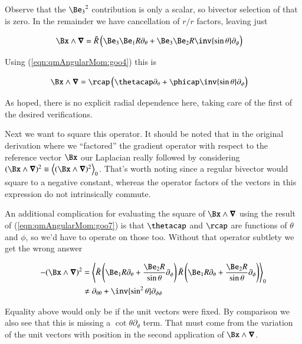 Observe that the ${\Be_3}^2$ contribution is only a scalar, so bivector selection of that is zero.  In the remainder we have cancellation of $r/r$ factors, leaving just

\begin{align}\label{eqn:qmAngularMom:goo6}
\Bx \wedge \spacegrad 
&=
\tilde{R} \left( \Be_3 \Be_1 R \partial_\theta + \Be_3 \Be_2 R \inv{\sin\theta} \partial_\phi \right) 
\end{align}

Using (\ref{eqn:qmAngularMom:goo4}) this is

\begin{align}\label{eqn:qmAngularMom:goo7}
\Bx \wedge \spacegrad 
&=
\rcap \left( \thetacap \partial_\theta + \phicap \inv{\sin\theta} \partial_\phi \right) 
\end{align}

As hoped, there is no explicit radial dependence here, taking care of the first of the desired verifications.

Next we want to square this operator.  It should be noted that in the original derivation where we ``factored'' the gradient operator with respect to the reference vector $\Bx$ our Laplacian really followed by considering $(\Bx \wedge \spacegrad)^2 \equiv \gpgradezero{(\Bx \wedge \spacegrad)^2}$.  That's worth noting since a regular bivector would square to a negative constant, whereas the operator factors of the vectors in this expression do not intrinsically commute.

An additional complication for evaluating the square of $\Bx \wedge \spacegrad$ using the result of (\ref{eqn:qmAngularMom:goo7}) is that $\thetacap$ and $\rcap$ are functions of $\theta$ and $\phi$, so we'd have to operate on those too.  Without that operator subtlety we get the wrong answer

\begin{align*}
-(\Bx \wedge \spacegrad)^2
&=
\gpgradezero{ 
\tilde{R} \left( \Be_1 R \partial_\theta + \frac{\Be_2 R}{\sin\theta}\partial_\phi \right)
\tilde{R} \left( \Be_1 R \partial_\theta + \frac{\Be_2 R}{\sin\theta}\partial_\phi \right)
 } \\
&\ne
\partial_{\theta\theta} + \inv{\sin^2\theta} \partial_{\phi\phi}
\end{align*}

Equality above would only be if the unit vectors were fixed.  By comparison we also see that this is missing a $\cot\theta \partial_\theta$ term.  That must come from the variation of the unit vectors with position in the second application of $\Bx \wedge \spacegrad$.

\EndArticle
